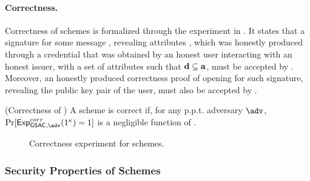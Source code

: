 \paragraph{Correctness.} %
Correctness of \GSAC schemes is formalized through the experiment in
. It states that a signature for some message \msg,
revealing attributes \dattrs, which was honestly produced through a credential
that was obtained by an honest user interacting with an honest issuer, with a
set of attributes \attrs such that $\mathbf{d} \subseteq \mathbf{a}$, must be accepted
by \Verify. Moreover, an honestly produced correctness proof of opening for such
signature, revealing the public key pair of the user, must also be accepted by
\Judge.

\begin{definition}{(Correctness of \GSAC)}
  \label{def:correctness-gsac}
  A \GSAC scheme is correct if, for any p.p.t. adversary $\adv$,
  $\Pr[\ExpGSACCorrect(1^\secpar) = 1]$ is a negligible function of \secpar.
\end{definition}

\begin{figure}[htp!]
  \caption{Correctness experiment for \GSAC schemes.}
  \label{fig:exp-gsac-corr}
\end{figure}

\subsubsection{Security Properties of \GSAC Schemes}
\label{sssec:security-gsac}

